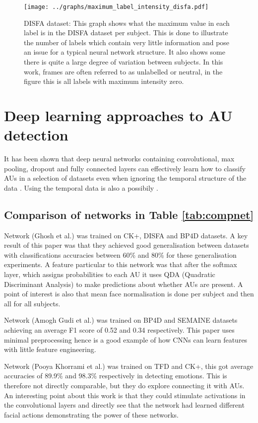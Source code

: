 \begin{figure}[h!]
  \texttt{[image: ../graphs/maximum\_label\_intensity\_disfa.pdf]}
  \caption{DISFA dataset: This graph shows what the maximum value in each label is in the DISFA dataset per subject. This
  is done to illustrate the number of labels which contain very little information
  and pose an issue for a typical neural network structure. It also shows some there
  is quite a large degree of variation between subjects. In this work, frames are often referred to as unlabelled or neutral,
  in the figure this is all labels with maximum intensity zero.}\label{disfastats}
\end{figure}
\newpage

\section{Deep learning approaches to AU detection}
It has been shown that deep neural networks containing convolutional, max pooling,
dropout and fully connected layers can effectively learn how to classify AUs in
a selection of datasets even when ignoring the temporal structure of the data \cite{Gudi2015,Ghosh2015,dodeeplearn}.
Using the temporal data is also a possibily \cite{emonet,Jaiswal2016}.
%
%
%
\subsection*{Comparison of networks in Table \ref{tab:compnet}}
Network \cite{Ghosh2015} (Ghosh et al.) was trained on CK+, DISFA and BP4D datasets.
A key result of this paper was that they achieved good generalisation between datasets
with classifications accuracies between 60\% and 80\% for these generalisation experiments.
A feature particular to this network was that after the softmax layer, which assigns probabilities
to each AU it uses QDA (Quadratic Discriminant Analysis\cite{precogbook})  to
make predictions about whether AUs are present. A point of interest is also that
mean face normalisation is done per subject and then all for all subjects.

Network \cite{Gudi2015} (Amogh Gudi et al.) was trained on BP4D and SEMAINE
datasets achieving an average F1 score of 0.52 and 0.34 respectively. This paper
uses minimal preprocessing hence is a good example of how CNNs can learn features
with little feature engineering.

Network \cite{dodeeplearn} (Pooya Khorrami et al.) was trained on TFD and CK+,
this got average accuracies of 89.9\% and 98.3\% respectively in detecting emotions. This
is therefore not directly comparable, but they do explore connecting it with AUs.
An interesting point about this work is that they could stimulate activations in the convolutional
layers and directly see that the network had learned different facial actions demonstrating the
power of these networks.

